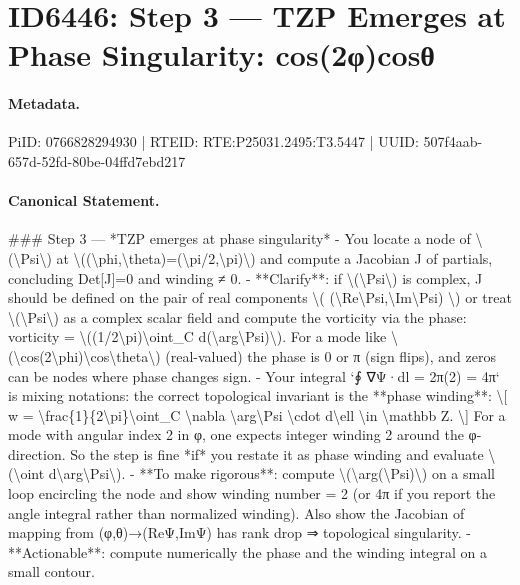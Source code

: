 \section*{ID6446: Step 3 — TZP Emerges at Phase Singularity: cos(2φ)cosθ}
\paragraph{Metadata.}
PiID: 0766828294930 | RTEID: RTE:P25031.2495:T3.5447 | UUID: 507f4aab-657d-52fd-80be-04ffd7ebd217

\paragraph{Canonical Statement.}
\#\#\# Step 3 — *TZP emerges at phase singularity* - You locate a node of \textbackslash{}(\textbackslash{}Psi\textbackslash{}) at \textbackslash{}((\textbackslash{}phi,\textbackslash{}theta)=(\textbackslash{}pi/2,\textbackslash{}pi)\textbackslash{}) and compute a Jacobian J of partials, concluding Det[J]=0 and winding ≠ 0. - **Clarify**: if \textbackslash{}(\textbackslash{}Psi\textbackslash{}) is complex, J should be defined on the pair of real components \textbackslash{}( (\textbackslash{}Re\textbackslash{}Psi,\textbackslash{}Im\textbackslash{}Psi) \textbackslash{}) or treat \textbackslash{}(\textbackslash{}Psi\textbackslash{}) as a complex scalar field and compute the vorticity via the phase: vorticity = \textbackslash{}((1/2\textbackslash{}pi)\textbackslash{}oint\_C d(\textbackslash{}arg\textbackslash{}Psi)\textbackslash{}). For a mode like \textbackslash{}(\textbackslash{}cos(2\textbackslash{}phi)\textbackslash{}cos\textbackslash{}theta\textbackslash{}) (real-valued) the phase is 0 or π (sign flips), and zeros can be nodes where phase changes sign. - Your integral `∮ ∇Ψ·dl = 2π(2) = 4π` is mixing notations: the correct topological invariant is the **phase winding**: \textbackslash{}[ w = \textbackslash{}frac\{1\}\{2\textbackslash{}pi\}\textbackslash{}oint\_C \textbackslash{}nabla \textbackslash{}arg\textbackslash{}Psi \textbackslash{}cdot d\textbackslash{}ell \textbackslash{}in \textbackslash{}mathbb Z. \textbackslash{}] For a mode with angular index 2 in φ, one expects integer winding 2 around the φ-direction. So the step is fine *if* you restate it as phase winding and evaluate \textbackslash{}(\textbackslash{}oint d\textbackslash{}arg\textbackslash{}Psi\textbackslash{}). - **To make rigorous**: compute \textbackslash{}(\textbackslash{}arg(\textbackslash{}Psi)\textbackslash{}) on a small loop encircling the node and show winding number = 2 (or 4π if you report the angle integral rather than normalized winding). Also show the Jacobian of mapping from (φ,θ)→(ReΨ,ImΨ) has rank drop ⇒ topological singularity. - **Actionable**: compute numerically the phase and the winding integral on a small contour.

